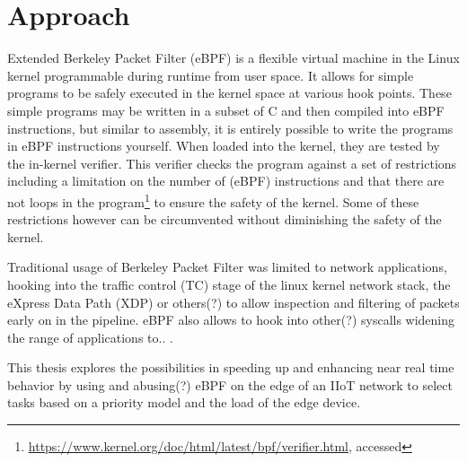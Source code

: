 \section{Approach}

Extended Berkeley Packet Filter (eBPF) is a flexible virtual machine in the
Linux kernel programmable during runtime from user space. It allows for simple
programs to be safely executed in the kernel space at various hook points. These
simple programs may be written in a subset of C and then compiled into eBPF
instructions, but similar to assembly, it is entirely possible to write the
programs in eBPF instructions yourself. When loaded into the kernel, they are
tested by the in-kernel verifier. This verifier checks the program against a set
of restrictions including a limitation on the number of (eBPF) instructions and
that there are not loops in the
program\footnote{\url{https://www.kernel.org/doc/html/latest/bpf/verifier.html},
accessed } to
ensure the safety of the kernel. Some of these restrictions however can be
circumvented without diminishing the safety of the kernel.

Traditional usage of Berkeley Packet Filter was limited to network applications,
hooking into the traffic control (TC) stage of the linux kernel network stack,
the eXpress Data Path (XDP) or others(?) to allow inspection and filtering of
packets early on in the pipeline. eBPF also allows to hook into other(?)
syscalls widening the range of applications to.. .

This thesis explores the possibilities in speeding up and enhancing near real
time behavior by using and abusing(?) eBPF on the edge of an IIoT network to select
tasks based on a priority model and the load of the edge device.
